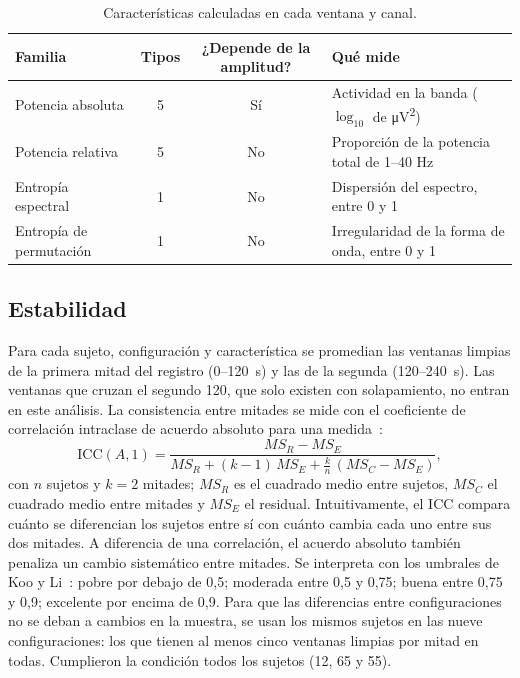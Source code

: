\documentclass[11pt,a4paper]{article}
\begin{document}
\begin{table}[ht]
\centering\small
\caption{Características calculadas en cada ventana y canal.}
\label{tab:features}
\begin{tabularx}{\textwidth}{@{}l c c >{\raggedright\arraybackslash}X@{}}
\toprule
Familia & Tipos & ¿Depende de la amplitud? & Qué mide \\
\midrule
Potencia absoluta & 5 & Sí & Actividad en la banda ($\log_{10}$ de \si{\micro\volt\squared}) \\
Potencia relativa & 5 & No & Proporción de la potencia total de 1--40 Hz \\
Entropía espectral & 1 & No & Dispersión del espectro, entre 0 y 1 \\
Entropía de permutación & 1 & No & Irregularidad de la forma de onda, entre 0 y 1 \\
\bottomrule
\end{tabularx}
\end{table}

\subsection{Estabilidad}
Para cada sujeto, configuración y característica se promedian las ventanas limpias de la primera mitad del registro (0--120~s) y las de la segunda (120--240~s). Las ventanas que cruzan el segundo 120, que solo existen con solapamiento, no entran en este análisis. La consistencia entre mitades se mide con el coeficiente de correlación intraclase de acuerdo absoluto para una medida~\cite{mcgraw1996}:
\begin{equation}
  \mathrm{ICC}(A,1) = \frac{MS_R - MS_E}{MS_R + (k-1)\,MS_E + \frac{k}{n}\,(MS_C - MS_E)},
\end{equation}
con $n$ sujetos y $k = 2$ mitades; $MS_R$ es el cuadrado medio entre sujetos, $MS_C$ el cuadrado medio entre mitades y $MS_E$ el residual. Intuitivamente, el ICC compara cuánto se diferencian los sujetos entre sí con cuánto cambia cada uno entre sus dos mitades. A diferencia de una correlación, el acuerdo absoluto también penaliza un cambio sistemático entre mitades. Se interpreta con los umbrales de Koo y Li~\cite{koo2016}: pobre por debajo de 0,5; moderada entre 0,5 y 0,75; buena entre 0,75 y 0,9; excelente por encima de 0,9. Para que las diferencias entre configuraciones no se deban a cambios en la muestra, se usan los mismos sujetos en las nueve configuraciones: los que tienen al menos cinco ventanas limpias por mitad en todas. Cumplieron la condición todos los sujetos (12, 65 y 55).
\end{document}
